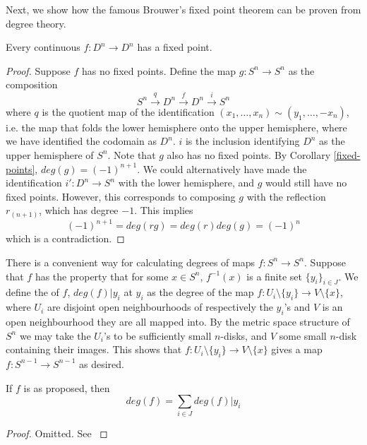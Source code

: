 Next, we show how the famous Brouwer's fixed point theorem can be proven from degree theory.

\begin{theorem}
Every continuous $f:D^n\rightarrow D^n$ has a fixed point.
\end{theorem}
\begin{proof}
Suppose $f$ has no fixed points. Define the map $g:S^n\rightarrow S^n$ as the composition 
$$S^n\xrightarrow{q}D^n\xrightarrow{f}D^n\xrightarrow{i}S^n$$
where $q$ is the quotient map of the identification $(x_1,\dots,x_n)\sim (y_1,\dots,-x_n)$, i.e. the map that folds the lower hemisphere onto the upper hemisphere, where we have identified the codomain as $D^n$. $i$ is the inclusion identifying $D^n$ as the upper hemisphere of $S^n$. Note that $g$ also has no fixed points. By Corollary \ref{fixed-points}, $deg(g)=(-1)^{n+1}$. We could alternatively have made the identification $i':D^n\rightarrow S^n$ with the lower hemisphere, and $g$ would still have no fixed points. However, this corresponds to composing $g$ with the reflection $r_{(n+1)}$, which has degree $-1$. This implies
$$(-1)^{n+1}=deg(rg)=deg(r)deg(g)=(-1)^{n}$$
which is a contradiction.
\end{proof}


There is a convenient way for calculating degrees of maps $f:S^n\rightarrow S^n$. Suppose that $f$ has the property that for some $x\in S^n$, $f^{-1}(x)$ is a finite set $\{y_i\}_{i\in J}$. We define the  of $f$, $deg(f)|{y_i}$ at $y_i$ as the degree of the map $f:U_i\setminus \{y_i\}\rightarrow V\setminus\{x\}$, where $U_i$ are disjoint open neighbourhoods of respectively the $y_i$'s and $V$ is an open neighbourhood they are all mapped into. By the metric space structure of $S^n$ we may take the $U_i$'s to be sufficiently small $n$-disks, and $V$ some small $n$-disk containing their images. This shows that $f:U_i\setminus \{y_i\}\rightarrow V\setminus\{x\}$ gives a map $f:S^{n-1}\rightarrow S^{n-1}$ as desired.

\begin{proposition}\label{local-degree}
If $f$ is as proposed, then $$deg(f)=\sum_{i\in J}deg(f)|{y_i}$$
\end{proposition}
\begin{proof}
Omitted. See \cite{Hatcher}
\end{proof}